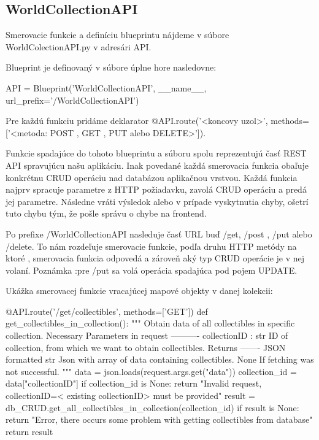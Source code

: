 \subsection*{WorldCollectionAPI}
Smerovacie funkcie a definíciu blueprintu nájdeme v súbore WorldColectionAPI.py v adresári API. 

Blueprint je definovaný v súbore úplne hore nasledovne: 
\begin{code}
      API = Blueprint('WorldCollectionAPI', __name__, url_prefix='/WorldCollectionAPI')
\end{code}

Pre každú funkciu pridáme deklarator @API.route('<koncovy uzol>', methods=['<metoda: POST , GET , PUT alebo DELETE>']). 

Funkcie spadajúce do tohoto blueprintu a súboru spolu reprezentujú časť REST API spravujúcu našu aplikáciu. Inak povedané každá smerovacia funkcia 
obaľuje konkrétnu CRUD operáciu nad databázou aplikačnou vrstvou. Každá funkcia najprv spracuje parametre z HTTP požiadavku, zavolá CRUD operáciu a predá jej parametre. Následne vráti výsledok alebo v prípade vyskytnutia chyby, ošetrí 
tuto chybu tým, že pošle správu o chybe na frontend. 

Po prefixe /WorldCollectionAPI nasleduje časť URL buď /get, /post , /put alebo /delete. To nám rozdeľuje smerovacie funkcie, podľa druhu HTTP metódy na ktoré , smerovacia funkcia odpovedá a zároveň aký typ CRUD operácie je v nej volaní. 
Poznámka :pre /put sa volá operácia spadajúca pod pojem UPDATE. 

Ukážka smerovacej funkcie vracajúcej mapové objekty v danej kolekcii: 
\begin{code}
      @API.route('/get/collectibles', methods=['GET'])
      def get_collectibles_in_collection():
      """
      Obtain data of all collectibles in specific collection.
      Necessary Parameters in request
      ----------
      collectionID : str
      ID of collection, from which we want to obtain collectibles.
      Returns
      -------
      JSON formatted str
      Json with array of data containing collectibles.
      None
      If fetching was not successful.
      """
      data = json.loads(request.args.get("data"))
      collection_id = data["collectionID"]
      if collection_id is None:
      return "Invalid request, collectionID=< existing collectionID>
      must be provided"
      result = db_CRUD.get_all_collectibles_in_collection(collection_id)
      if result is None:
      return "Error, there occurs some problem with getting
      collectibles from database"
      return result
\end{code}

